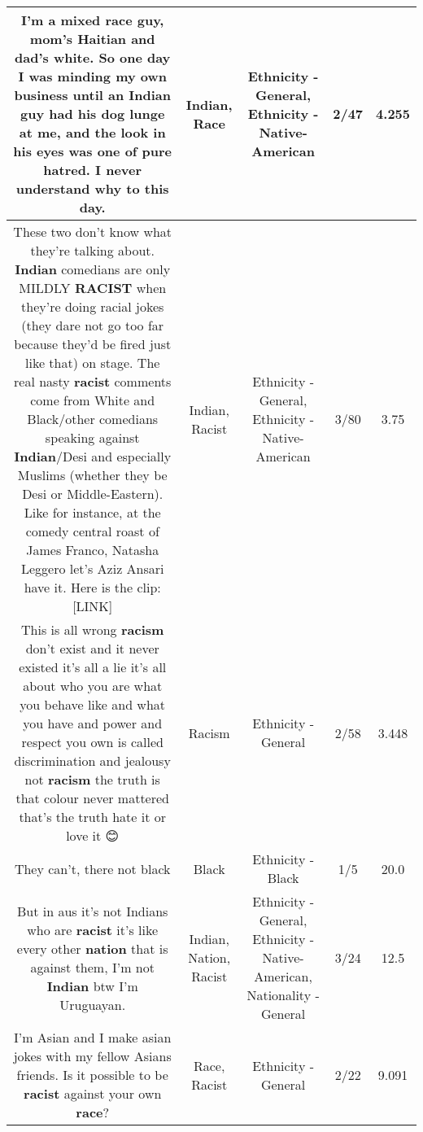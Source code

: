 \documentclass[11pt]{article}
\newlength\mylength
\begin{document}
\begin{center}
\begin{longtable}{|C{.65\mylength}|C{.30\mylength}|C{.12\mylength}|C{.12\mylength}|C{.12\mylength}|}
  \small I'm a mixed \textbf{race} guy, mom's Haitian and dad's white. So one day I was minding my own business until an \textbf{Indian} guy had his dog lunge at me, and the look in his eyes was one of pure hatred. I never understand why to this day.\normalsize   & Indian, Race & Ethnicity - General, Ethnicity - Native-American & 2/47 & 4.255 \\  \hline
  \small These two don't know what they're talking about. \textbf{Indian} comedians are only MILDLY \textbf{RACIST} when they're doing racial jokes (they dare not go too far because they'd be fired just like that) on stage. The real nasty \textbf{racist} comments come from White and Black/other comedians speaking against \textbf{Indian}/Desi and especially Muslims (whether they be Desi or Middle-Eastern). Like for instance, at the comedy central roast of James Franco, Natasha Leggero let's Aziz Ansari have it. Here is the clip:  [LINK] \normalsize   & Indian, Racist & Ethnicity - General, Ethnicity - Native-American & 3/80 & 3.75 \\  \hline
  \small This is all wrong \textbf{racism} don't exist and it never existed it's all a lie it's all about who you are what you behave like and what you have and power and respect you own is called discrimination and jealousy not \textbf{racism} the truth is that colour never mattered that's the truth hate it or love it 😊\normalsize   & Racism & Ethnicity - General & 2/58 & 3.448 \\  \hline
  \small They can't, there not black\normalsize   & Black & Ethnicity - Black & 1/5 & 20.0 \\  \hline
  \small But in aus it's not Indians who are \textbf{racist} it's like every other \textbf{nation} that is against them, I'm not \textbf{Indian} btw I'm Uruguayan.\normalsize   & Indian, Nation, Racist & Ethnicity - General, Ethnicity - Native-American, Nationality - General & 3/24 & 12.5 \\  \hline
  \small I'm Asian and I make asian jokes with my fellow Asians friends. Is it possible to be \textbf{racist} against your own \textbf{race}?\normalsize   & Race, Racist & Ethnicity - General & 2/22 & 9.091 \\  \hline

\end{longtable}
\end{center}
\end{document}
